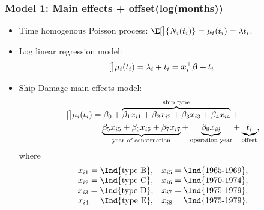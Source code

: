 \documentclass[oneside]{book}\usepackage[]{graphicx}\usepackage[svgnames]{xcolor}
\let\log\relax%
\providecommand{\Vector}[1]{\bm{#1}}%
\begin{document}
\subsubsection*{Model 1: Main effects + offset(log(months))}
\begin{itemize}
      \item Time homogenous Poisson process: $ \E[\big]{N_i(t_i)}=\mu_t(t_i)=\lambda t_i $.
      \item Log linear regression model:
            \[ \log[\big]{\mu_i(t_i)}=\log{\lambda_i}+\log{t_i}=\Vector{x}_i^\top \Vector{\beta}+\log{t_i}. \]
      \item Ship Damage main effects model:
            \begin{align*}
                  \log[\big]{\mu_i(t_i)}
                   & =\beta_0+\overbrace{\beta_1x_{i1}+\beta_2x_{i2}+\beta_3x_{i3}+\beta_4x_{i4}}^{\text{ship type}}+ \\
                   & \quad \underbrace{\beta_5x_{i5}+\beta_6x_{i6}+\beta_7x_{i7}}_{\text{year of construction}}+
                  \underbrace{\beta_8x_{i8}}_{\text{operation year}}+\underbrace{\log{t_i}}_{\text{offset}},
            \end{align*}
            where
            \[ \begin{array}{cc}
                        x_{i1}=\Ind{\text{type B}}, & x_{i5}=\Ind{\text{1965-1969}}, \\
                        x_{i2}=\Ind{\text{type C}}, & x_{i6}=\Ind{\text{1970-1974}}, \\
                        x_{i3}=\Ind{\text{type D}}, & x_{i7}=\Ind{\text{1975-1979}}, \\
                        x_{i4}=\Ind{\text{type E}}, & x_{i8}=\Ind{\text{1975-1979}}. \\
                  \end{array} \]
\end{itemize}
\end{document}
